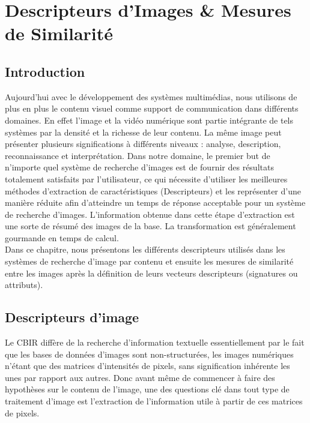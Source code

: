 
\chapter{Descripteurs d'Images \&  Mesures de Similarité} %

\label{ChapterX} %


\section{Introduction}
Aujourd’hui avec le développement des systèmes multimédias, nous utilisons de plus en plus le contenu visuel comme support de communication dans différents domaines. En effet l’image et la vidéo numérique sont partie intégrante de tels systèmes par la densité et la richesse de leur contenu. La même image peut présenter plusieurs significations à différents niveaux : analyse, description, reconnaissance et interprétation. Dans notre domaine, le premier but de n’importe quel système de recherche d’images est de fournir des résultats totalement satisfaits par l'utilisateur, ce qui nécessite d’utiliser les meilleures méthodes d’extraction de caractéristiques (Descripteurs) et les représenter d’une manière réduite afin d’atteindre un temps de réponse acceptable pour un système de recherche d'images. L'information obtenue dans cette étape d'extraction est une sorte de résumé des images de la base. La transformation est généralement gourmande en temps de calcul.\\

Dans ce chapitre, nous présentons les différents descripteurs utilisés dans les systèmes de recherche d'image par contenu et ensuite les mesures de similarité entre les images après la définition de leurs vecteurs descripteurs (signatures ou attributs).





\section{Descripteurs d'image}
Le CBIR diffère de la recherche d’information textuelle essentiellement par le fait que les bases de données d’images sont non-structurées, les images numériques n’étant que des matrices d’intensités de pixels, sans signification inhérente les unes par rapport aux autres. Donc avant même de commencer à faire des hypothèses sur le contenu de l’image, une des questions clé dans tout type de traitement d’image est l’extraction de l'information utile à partir de ces matrices de pixels.\\

